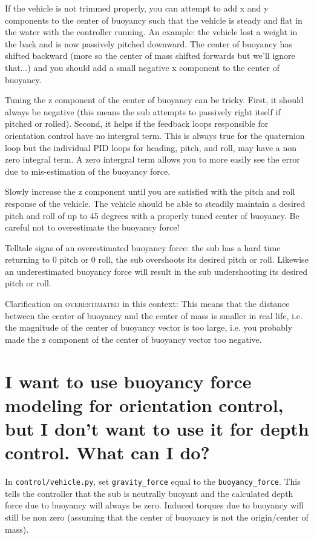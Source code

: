 \documentclass[11pt]{article}
\newcommand{\question}[1] %
{
  \section{#1}
}
\begin{document}
    If the vehicle is not trimmed properly, you can attempt to add x and y components to the center of buoyancy such that the vehicle is steady and flat in the water with the controller running. An example: the vehicle lost a weight in the back and is now passively pitched downward. The center of buoyancy has shifted backward (more so the center of mass shifted forwards but we'll ignore that...) and you should add a small negative x component to the center of buoyancy.

    Tuning the z component of the center of buoyancy can be tricky. First, it should always be negative (this means the sub attempts to passively right itself if pitched or rolled). Second, it helps if the feedback loops responsible for orientation control have no intergral term. This is always true for the quaternion loop but the individual PID loops for heading, pitch, and roll, may have a non zero integral term. A zero intergral term allows you to more easily see the error due to mis-estimation of the buoyancy force.

    Slowly increase the z component until you are satisfied with the pitch and roll response of the vehicle. The vehicle should be able to steadily maintain a desired pitch and roll of up to 45 degrees with a properly tuned center of buoyancy. Be careful not to overestimate the buoyancy force!

    Telltale signs of an overestimated buoyancy force: the sub has a hard time returning to 0 pitch or 0 roll, the sub overshoots its desired pitch or roll. Likewise an underestimated buoyancy force will result in the sub undershooting its desired pitch or roll.

    Clarification on \textsc{overestimated} in this context: This means that the distance between the center of buoyancy and the center of mass is smaller in real life, i.e. the magnitude of the center of buoyancy vector is too large, i.e. you probably made the z component of the center of buoyancy vector too negative.\\

\question{I want to use buoyancy force modeling for orientation control, but I don't want to use it for depth control. What can I do?}

    In \texttt{control/vehicle.py}, set \texttt{gravity\_force} equal to the \texttt{buoyancy\_force}. This tells the controller that the sub is neutrally buoyant and the calculated depth force due to buoyancy will always be zero. Induced torques due to buoyancy will still be non zero (assuming that the center of buoyancy is not the origin/center of mass).\\
\end{document}
